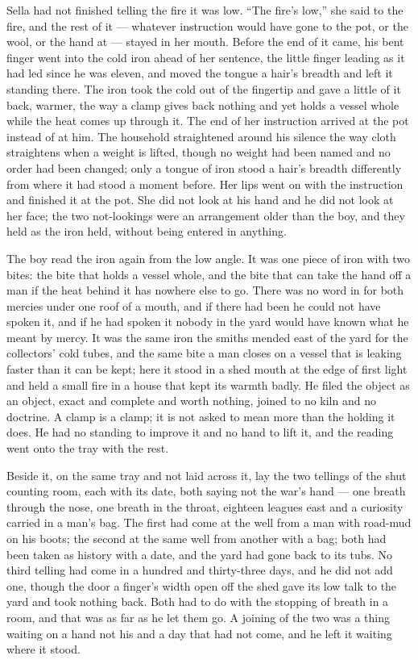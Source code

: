 \scenebreak

Sella had not finished telling the fire it was low. “The fire's low,” she said to the fire, and the rest of it --- whatever instruction would have gone to the pot, or the wool, or the hand at  --- stayed in her mouth. Before the end of it came, his bent finger went into the cold iron ahead of her sentence, the little finger leading as it had led since he was eleven, and moved the tongue a hair's breadth and left it standing there. The iron took the cold out of the fingertip and gave a little of it back, warmer, the way a clamp gives back nothing and yet holds a vessel whole while the heat comes up through it. The end of her instruction arrived at the pot instead of at him. The household straightened around his silence the way cloth straightens when a weight is lifted, though no weight had been named and no order had been changed; only a tongue of iron stood a hair's breadth differently from where it had stood a moment before. Her lips went on with the instruction and finished it at the pot. She did not look at his hand and he did not look at her face; the two not-lookings were an arrangement older than the boy, and they held as the iron held, without being entered in anything.

The boy read the iron again from the low angle. It was one piece of iron with two bites: the bite that holds a vessel whole, and the bite that can take the hand off a man if the heat behind it has nowhere else to go. There was no word in  for both mercies under one roof of a mouth, and if there had been he could not have spoken it, and if he had spoken it nobody in the yard would have known what he meant by mercy. It was the same iron the smiths mended east of the yard for the collectors' cold tubes, and the same bite a man closes on a vessel that is leaking faster than it can be kept; here it stood in a shed mouth at the edge of first light and held a small fire in a house that kept its warmth badly. He filed the object as an object, exact and complete and worth nothing, joined to no kiln and no doctrine. A clamp is a clamp; it is not asked to mean more than the holding it does. He had no standing to improve it and no hand to lift it, and the reading went onto the tray with the rest.

Beside it, on the same tray and not laid across it, lay the two tellings of the shut counting room, each with its date, both saying not the war's hand --- one breath through the nose, one breath in the throat, eighteen leagues east and a curiosity carried in a man's bag. The first had come at the well from a man with road-mud on his boots; the second at the same well from another with a bag; both had been taken as history with a date, and the yard had gone back to its tubs. No third telling had come in a hundred and thirty-three days, and he did not add one, though the door a finger's width open off the shed gave its low talk to the yard and took nothing back. Both had to do with the stopping of breath in a room, and that was as far as he let them go. A joining of the two was a thing waiting on a hand not his and a day that had not come, and he left it waiting where it stood.

